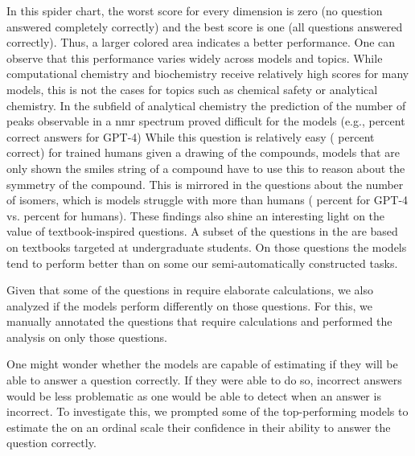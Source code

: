 \documentclass[11pt, oneside]{article}
\begin{document}
\begin{refsection}
In this spider chart, the worst score for every dimension is zero (no question answered completely correctly) and the best score is one (all questions answered correctly). 
Thus, a larger colored area indicates a better performance. 
One can observe that this performance varies widely across models and topics. 
While computational chemistry and biochemistry receive relatively high scores for many models, this is not the cases for topics such as chemical safety or analytical chemistry.
In the subfield of analytical chemistry the prediction of the number of peaks observable in a \gls{nmr} spectrum proved difficult for the models (e.g.,  percent correct answers for GPT-4) 
While this question is relatively easy ( percent correct) for trained humans given a drawing of the compounds, models that are only shown the \gls{smiles} string of a compound have to use this to reason about the symmetry of the compound. 
This is mirrored in the questions about the number of isomers, which is models struggle with more than humans ( percent for GPT-4 vs.  percent for humans).
These findings also shine an interesting light on the value of textbook-inspired questions. A subset of the questions in the \chembench are based on textbooks targeted at undergraduate students. 
On those questions the models tend to perform better than on some our semi-automatically constructed tasks.


Given that some of the questions in \chembench require elaborate calculations, we also analyzed if the models perform differently on those questions.
For this, we manually annotated the questions that require calculations and performed the analysis on only those questions. 


One might wonder whether the models are capable of estimating if they will be able to answer a question correctly. 
If they were able to do so, incorrect answers would be less problematic as one would be able to detect when an answer is incorrect.
To investigate this, we prompted\autocite{xiong2023llms} some of the top-performing models to estimate the on an ordinal scale their confidence in their ability to answer the question correctly.


\end{refsection}
\end{document}
